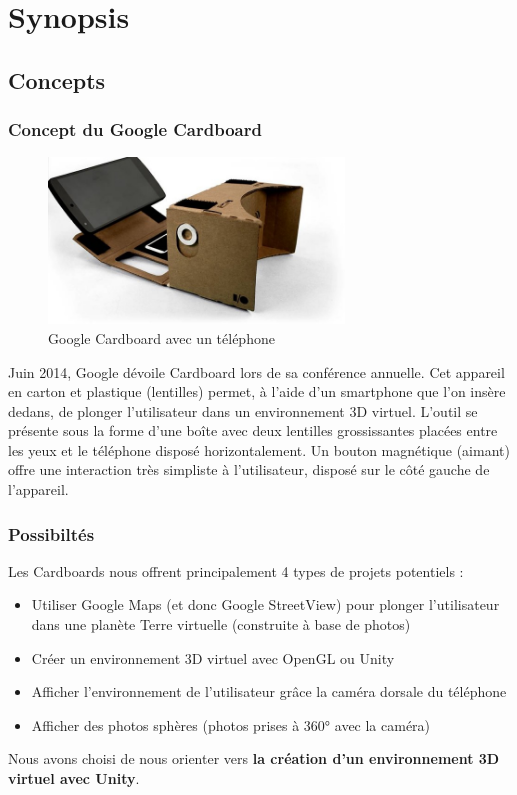 \chapter{Synopsis}

\section{Concepts}

\subsection{Concept du Google Cardboard}

\begin{figure}[h!]
  \centering
  \includegraphics[width=0.7\textwidth]{res/img/cardboard1.jpg}
  \caption{Google Cardboard avec un téléphone}
\end{figure}

Juin 2014, Google dévoile Cardboard lors de sa conférence annuelle. Cet appareil en carton et plastique (lentilles) permet, à l'aide d'un smartphone que l'on insère dedans, de plonger l'utilisateur dans un environnement 3D virtuel. L'outil se présente sous la forme d'une boîte avec deux lentilles grossissantes placées entre les yeux et le téléphone disposé horizontalement. Un \og{}bouton\fg{} magnétique (aimant) offre une interaction très simpliste à l'utilisateur, disposé sur le côté gauche de l'appareil.

\subsection{Possibiltés}

\noindent Les Cardboards nous offrent principalement 4 types de projets potentiels :

\begin{itemize}
  \item Utiliser Google Maps (et donc Google StreetView) pour plonger l'utilisateur dans une planète Terre virtuelle (construite à base de photos)
  \item Créer un environnement 3D virtuel avec OpenGL ou Unity
  \item Afficher l'environnement de l'utilisateur grâce la caméra dorsale du téléphone
  \item Afficher des photos sphères (photos prises à 360° avec la caméra)
\end{itemize}
Nous avons choisi de nous orienter vers \textbf{la création d'un environnement 3D virtuel avec Unity}.


